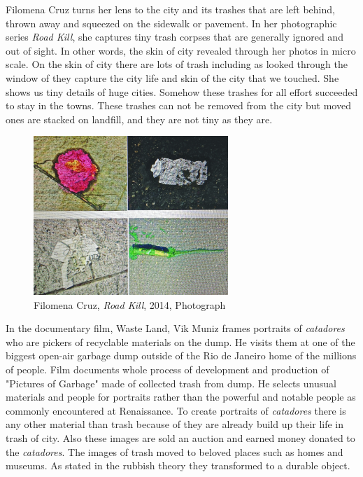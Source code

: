 Filomena Cruz turns her lens to the city and its trashes that are left behind, thrown away and squeezed on the sidewalk or pavement. In her photographic series \textit{Road Kill}, she captures tiny trash corpses that are generally ignored and out of sight. In other words, the skin of city revealed through her photos in micro scale. On the skin of city there are lots of trash including  as looked through the window of they capture the city life and skin of the city that we touched. She shows us tiny details of huge cities. Somehow these trashes for all effort succeeded to stay in the towns. These trashes can not be removed from the city but moved ones are stacked on landfill, and they are not tiny as they are.

\begin{figure}[h!]
  \centering
  \includegraphics[height=6cm]{graphics/FilomenaCruz_RoadKill_ReVista.jpg}
  \caption{Filomena Cruz, \textit{Road Kill}, 2014, Photograph}
  \label{fig:FilomenaCruz_RoadKill_ReVista}
\end{figure}

In the documentary film, Waste Land, Vik Muniz frames portraits of \textit{catadores} who are pickers of recyclable materials on the dump. He visits them at one of the biggest open-air garbage dump outside of the Rio de Janeiro home of the millions of people. Film documents whole process of development and production of "Pictures of Garbage" made of collected trash from dump. He selects unusual materials and people for portraits rather than the powerful and notable people as commonly encountered at Renaissance. To create portraits of \textit{catadores} there is any other material than trash because of they are already build up their life in trash of city. Also these images are sold an auction and earned money donated to the \textit{catadores}. The images of trash moved to beloved places such as homes and museums. As stated in the rubbish theory they transformed to a durable object.

